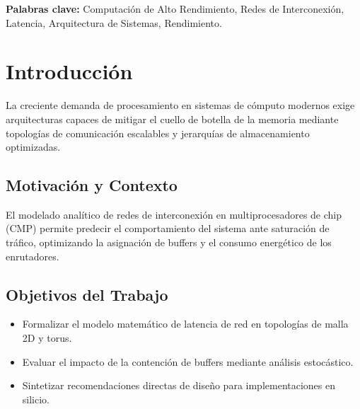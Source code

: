 

\maketitle

\begin{abstract}
Este documento ejemplifica la estructura formal requerida para monografías académicas, informes técnicos de investigación y proyectos finales de grado. Se presenta un resumen ejecutivo conciso del contexto problemático, los objetivos metodológicos, los resultados analíticos cuantitativos y las conclusiones principales alcanzadas, permitiendo al evaluador una rápida comprensión de la contribución técnica.
\end{abstract}

\vspace{1em}
\noindent\textbf{Palabras clave:} Computación de Alto Rendimiento, Redes de Interconexión, Latencia, Arquitectura de Sistemas, Rendimiento.

\newpage
\tableofcontents
\newpage

\section{Introducción}
La creciente demanda de procesamiento en sistemas de cómputo modernos exige arquitecturas capaces de mitigar el cuello de botella de la memoria mediante topologías de comunicación escalables y jerarquías de almacenamiento optimizadas.

\subsection{Motivación y Contexto}
El modelado analítico de redes de interconexión en multiprocesadores de chip (CMP) permite predecir el comportamiento del sistema ante saturación de tráfico, optimizando la asignación de buffers y el consumo energético de los enrutadores.

\subsection{Objetivos del Trabajo}
\begin{itemize}
    \item Formalizar el modelo matemático de latencia de red en topologías de malla 2D y torus.
    \item Evaluar el impacto de la contención de buffers mediante análisis estocástico.
    \item Sintetizar recomendaciones directas de diseño para implementaciones en silicio.
\end{itemize}

